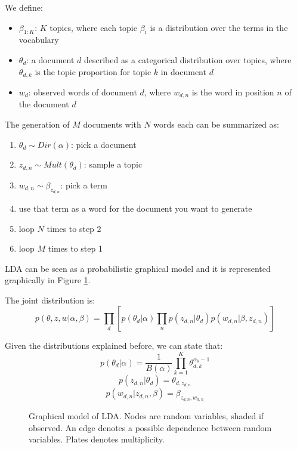 We define:
\begin{itemize}
    \item $\beta_{1:K}$: $K$ topics, where each topic $\beta_i$ is a distribution over the terms in the vocabulary
    \item $\theta_d$: a document $d$ described as a categorical distribution over topics, where $\theta_{d,k}$ is the topic proportion for topic $k$ in document $d$
    \item $w_{d}$: observed words of document $d$, where $w_{d,n}$ is the word in position $n$ of the document $d$
\end{itemize}

The generation of $M$ documents with $N$ words each can be summarized as:
\begin{enumerate}
    \item $\theta_d \sim Dir(\alpha)$: pick a document
    \item $z_{d,n} \sim Mult(\theta_d)$: sample a topic
    \item $w_{d,n} \sim \beta_{z_{d,n}}$: pick a term
    \item use that term as a word for the document you want to generate
    \item loop $N$ times to step 2
    \item loop $M$ times to step 1
\end{enumerate}

LDA can be seen as a probabilistic graphical model and it is represented graphically in Figure \ref{fig:lda}.

The joint distribution is:
$$ p(\theta, z, w | \alpha, \beta) = \prod_d [p(\theta_d | \alpha) \prod_n p(z_{d,n} | \theta_d) p(w_{d, n} | \beta, z_{d,n})] $$

Given the distributions explained before, we can state that:
$$ p(\theta_d | \alpha) = \frac{1}{B(\alpha)} \prod_{k=1}^K \theta_{d,k}^{\alpha_k - 1}$$
$$ p(z_{d,n} | \theta_d) = \theta_{d, z_{d,n}} $$
$$ p(w_{d,n} | z_{d,n}, \beta) = \beta_{z_{d,n},w_{d,n}} $$

\begin{figure}[h]
    \centering
    \caption{Graphical model of LDA. Nodes are random variables, shaded if observed. An edge denotes a possible dependence between random variables. Plates denotes multiplicity.}
    \label{fig:lda}
\end{figure}

